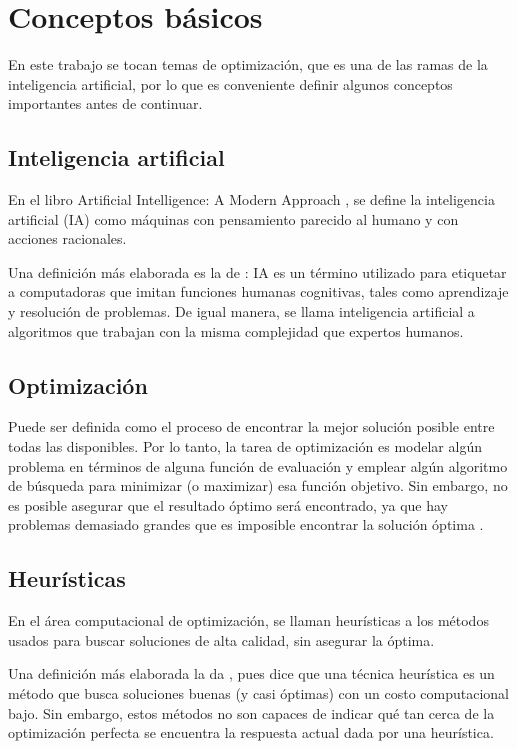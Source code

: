 \documentclass[letterpaper]{report}
\begin{document}
\section{Conceptos básicos}
  En este trabajo se tocan temas de optimización, que es una de las ramas de la
  inteligencia artificial, por lo que es conveniente definir algunos conceptos
  importantes antes de continuar. 

  \subsection{Inteligencia artificial}
    En el libro Artificial Intelligence: A Modern Approach
    \cite{AIModernAproach}, se define la inteligencia artificial (IA) como
    máquinas con pensamiento parecido al humano y con acciones racionales.
    
    Una definición más elaborada es la de \cite{AIDef}: IA es un término
    utilizado para etiquetar a computadoras que imitan funciones humanas
    cognitivas, tales como aprendizaje y resolución de problemas. De igual
    manera, se llama inteligencia artificial a algoritmos que trabajan con la
    misma complejidad que expertos humanos.
  
  \subsection{Optimización}
    Puede ser definida como el proceso de encontrar la mejor solución posible
    entre todas las disponibles. Por lo tanto, la tarea de optimización es
    modelar algún problema en términos de alguna función de evaluación y emplear
    algún algoritmo de búsqueda para minimizar (o maximizar) esa función
    objetivo. Sin embargo, no es posible asegurar que el resultado óptimo será
    encontrado, ya que hay problemas demasiado grandes que es imposible
    encontrar la solución óptima \cite{SearchMethodologies}.
  
  \subsection{Heurísticas}
    En el área computacional de optimización, se llaman heurísticas a los
    métodos usados para buscar soluciones de alta calidad, sin asegurar la
    óptima.

    Una definición más elaborada la da \cite{HeuristicDef}, pues dice
    que una técnica heurística es un método que busca soluciones buenas (y casi
    óptimas) con un costo computacional bajo. Sin embargo, estos métodos no son
    capaces de indicar qué tan cerca de la optimización perfecta se encuentra 
    la respuesta actual dada por una heurística.
  
\end{document}
